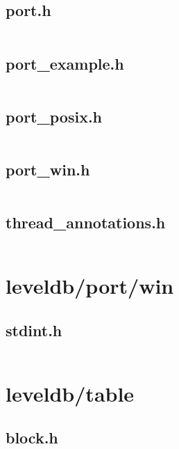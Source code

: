 \documentclass{article}
\begin{document}
\subsection{port.h}
\inputminted{cpp}{/home/dufferzafar/dev/@clones/bitcoin/src/leveldb/port/port.h}
\newpage

\subsection{port\_example.h}
\inputminted{cpp}{/home/dufferzafar/dev/@clones/bitcoin/src/leveldb/port/port_example.h}
\newpage

\subsection{port\_posix.h}
\inputminted{cpp}{/home/dufferzafar/dev/@clones/bitcoin/src/leveldb/port/port_posix.h}
\newpage

\subsection{port\_win.h}
\inputminted{cpp}{/home/dufferzafar/dev/@clones/bitcoin/src/leveldb/port/port_win.h}
\newpage

\subsection{thread\_annotations.h}
\inputminted{cpp}{/home/dufferzafar/dev/@clones/bitcoin/src/leveldb/port/thread_annotations.h}
\newpage

\section{leveldb/port/win}

\subsection{stdint.h}
\inputminted{cpp}{/home/dufferzafar/dev/@clones/bitcoin/src/leveldb/port/win/stdint.h}
\newpage

\section{leveldb/table}

\subsection{block.h}
\inputminted{cpp}{/home/dufferzafar/dev/@clones/bitcoin/src/leveldb/table/block.h}
\newpage
\end{document}
